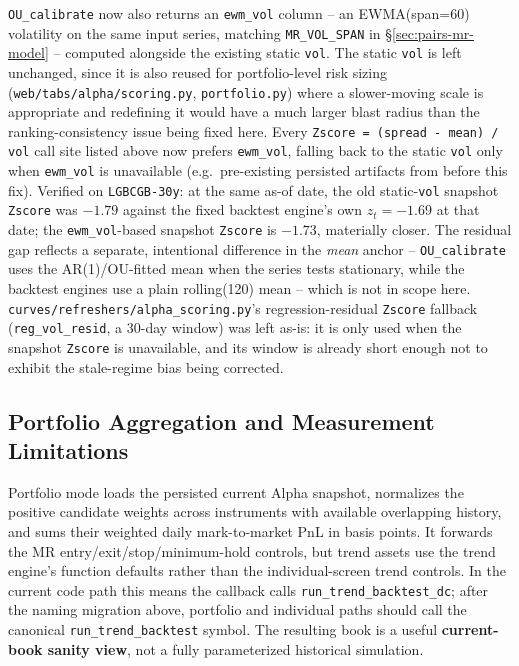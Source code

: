 \texttt{OU\_calibrate} now also returns an \texttt{ewm\_vol} column -- an
EWMA(span=$60$) volatility on the same input series, matching
\texttt{MR\_VOL\_SPAN} in \S\ref{sec:pairs-mr-model} -- computed alongside the
existing static \texttt{vol}. The static \texttt{vol} is left unchanged, since it is
also reused for portfolio-level risk sizing (\texttt{web/tabs/alpha/scoring.py},
\texttt{portfolio.py}) where a slower-moving scale is appropriate and redefining it
would have a much larger blast radius than the ranking-consistency issue being fixed
here. Every \texttt{Zscore = (spread - mean) / vol} call site listed above now prefers
\texttt{ewm\_vol}, falling back to the static \texttt{vol} only when \texttt{ewm\_vol}
is unavailable (e.g.\ pre-existing persisted artifacts from before this fix). Verified
on \texttt{LGBCGB-30y}: at the same as-of date, the old static-\texttt{vol} snapshot
\texttt{Zscore} was $-1.79$ against the fixed backtest engine's own $z_t=-1.69$ at that
date; the \texttt{ewm\_vol}-based snapshot \texttt{Zscore} is $-1.73$, materially closer.
The residual gap reflects a separate, intentional difference in the \emph{mean}
anchor -- \texttt{OU\_calibrate} uses the AR(1)/OU-fitted mean when the series tests
stationary, while the backtest engines use a plain rolling(120) mean -- which is not
in scope here. \texttt{curves/refreshers/alpha\_scoring.py}'s regression-residual
\texttt{Zscore} fallback (\texttt{reg\_vol\_resid}, a $30$-day window) was left as-is:
it is only used when the snapshot \texttt{Zscore} is unavailable, and its window is
already short enough not to exhibit the stale-regime bias being corrected.

\subsection{Portfolio Aggregation and Measurement Limitations}

Portfolio mode loads the persisted current Alpha snapshot, normalizes the positive
candidate weights across instruments with available overlapping history, and sums
their weighted daily mark-to-market PnL in basis points. It forwards the MR
entry/exit/stop/minimum-hold controls, but trend assets use the trend engine's
function defaults rather than the individual-screen trend controls. In the current
code path this means the callback calls \texttt{run\_trend\_backtest\_dc}; after
the naming migration above, portfolio and individual paths should call the canonical
\texttt{run\_trend\_backtest} symbol. The resulting
book is a useful \textbf{current-book sanity view}, not a fully parameterized historical
simulation.


